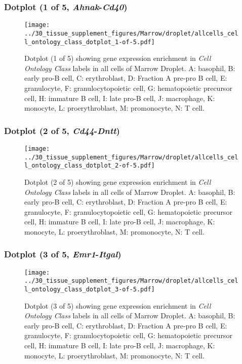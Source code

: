 \clearpage

\subsubsection{Dotplot (1 of 5, \emph{Ahnak}-\emph{Cd40})}
\begin{figure}[h]
\centering
\texttt{[image: ../30\_tissue\_supplement\_figures/Marrow/droplet/allcells\_cell\_ontology\_class\_dotplot\_1-of-5.pdf]}

\caption{ Dotplot (1 of 5)  showing gene expression enrichment in \emph{Cell Ontology Class} labels in all cells of Marrow Droplet. A: basophil, B: early pro-B cell, C: erythroblast, D: Fraction A pre-pro B cell, E: granulocyte, F: granulocytopoietic cell, G: hematopoietic precursor cell, H: immature B cell, I: late pro-B cell, J: macrophage, K: monocyte, L: proerythroblast, M: promonocyte, N: T cell.}
\end{figure}


\clearpage

\subsubsection{Dotplot (2 of 5, \emph{Cd44}-\emph{Dntt})}
\begin{figure}[h]
\centering
\texttt{[image: ../30\_tissue\_supplement\_figures/Marrow/droplet/allcells\_cell\_ontology\_class\_dotplot\_2-of-5.pdf]}

\caption{ Dotplot (2 of 5)  showing gene expression enrichment in \emph{Cell Ontology Class} labels in all cells of Marrow Droplet. A: basophil, B: early pro-B cell, C: erythroblast, D: Fraction A pre-pro B cell, E: granulocyte, F: granulocytopoietic cell, G: hematopoietic precursor cell, H: immature B cell, I: late pro-B cell, J: macrophage, K: monocyte, L: proerythroblast, M: promonocyte, N: T cell.}
\end{figure}


\clearpage

\subsubsection{Dotplot (3 of 5, \emph{Emr1}-\emph{Itgal})}
\begin{figure}[h]
\centering
\texttt{[image: ../30\_tissue\_supplement\_figures/Marrow/droplet/allcells\_cell\_ontology\_class\_dotplot\_3-of-5.pdf]}

\caption{ Dotplot (3 of 5)  showing gene expression enrichment in \emph{Cell Ontology Class} labels in all cells of Marrow Droplet. A: basophil, B: early pro-B cell, C: erythroblast, D: Fraction A pre-pro B cell, E: granulocyte, F: granulocytopoietic cell, G: hematopoietic precursor cell, H: immature B cell, I: late pro-B cell, J: macrophage, K: monocyte, L: proerythroblast, M: promonocyte, N: T cell.}
\end{figure}


